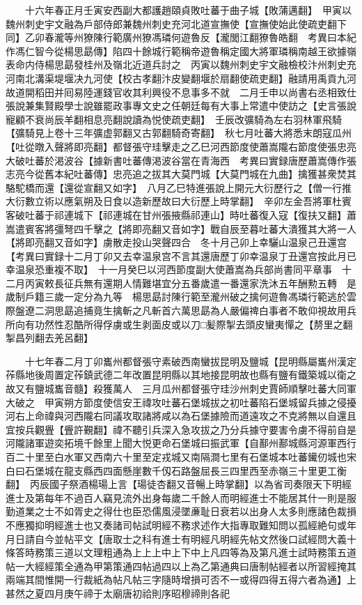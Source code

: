 　　十六年春正月壬寅安西副大都護趙頤貞敗吐蕃于曲子城【敗蒲邁翻】　甲寅以魏州刺史宇文融為戶部侍郎兼魏州刺史充河北道宣撫使【宣撫使始此使疏吏翻下同】乙卯春瀧等州獠陳行範廣州獠馮璘何遊魯反【瀧閭江翻獠魯皓翻　考異曰本紀作馮仁智今從楊思勗傳】陷四十餘城行範稱帝遊魯稱定國大將軍璘稱南越王欲據嶺表命内侍楊思勗發桂州及嶺北近道兵討之　丙寅以魏州刺史宇文融檢校汴州刺史充河南北溝渠堤堰决九河使【校古孝翻汴皮變翻堰於扇翻使疏吏翻】融請用禹貢九河故道開稻田并囘易陸運錢官收其利興役不息事多不就　二月壬申以尚書右丞相致仕張說兼集賢殿學士說雖罷政事專文史之任朝廷每有大事上常遣中使訪之【史言張說寵顧不衰尚辰羊翻相息亮翻說讀為悦使疏吏翻】　壬辰改彍騎為左右羽林軍飛騎【彍騎見上卷十三年彍虚郭翻又古郭翻騎奇寄翻】　秋七月吐蕃大將悉末朗寇瓜州【吐從暾入聲將即亮翻】都督張守珪擊走之乙巳河西節度使蕭嵩隴右節度使張忠亮大破吐蕃於渇波谷【據新書吐蕃傳渇波谷當在青海西　考異曰實録唐歷蕭嵩傳作張志亮今從舊本紀吐蕃傳】忠亮追之拔其大莫門城【大莫門城在九曲】擒獲甚衆焚其駱駝橋而還【還從宣翻又如字】　八月乙巳特進張說上開元大衍歷行之【僧一行推大衍數立術以應氣朔及日食以造新歷故曰大衍歷上時掌翻】　辛卯左金吾將軍杜賓客破吐蕃于祁連城下【祁連城在甘州張掖縣祁連山】時吐蕃復入寇【復扶又翻】蕭嵩遣賓客將彊弩四千擊之【將即亮翻又音如字】戰自辰至暮吐蕃大潰獲其大將一人【將即亮翻又音如字】虜散走投山哭聲四合　冬十月己卯上幸驪山温泉己丑還宫　【考異曰實録十二月丁卯又去幸温泉宫不言其還唐歷丁卯幸温泉丁丑還宫按此月已幸温泉恐重複不取】　十一月癸巳以河西節度副大使蕭嵩為兵部尚書同平章事　十二月丙寅敕長征兵無有還期人情難堪宜分五番歲遣一番還家洗沐五年酬勲五轉　是歲制戶籍三歲一定分為九等　楊思勗討陳行範至瀧州破之擒何遊魯馮璘行範逃於雲際盤遼二洞思勗追捕竟生擒斬之凡斬首六萬思勗為人嚴偏禆白事者不敢仰視故用兵所向有功然性忍酷所得俘虜或生剥面皮或以刀□髪際掣去頭皮蠻夷憚之【剺里之翻掣昌列翻去羌呂翻】

　　十七年春二月丁卯巂州都督張守素破西南蠻拔昆明及鹽城【昆明縣屬巂州漢定莋縣地後周置定莋鎮武德二年改置昆明縣以其地接昆明故也縣有鹽有鐵築城以衛之故又有鹽城巂音髓】殺獲萬人　三月瓜州都督張守珪沙州刺史賈師順擊吐蕃大同軍大破之　甲寅朔方節度使信安王禕攻吐蕃石堡城拔之初吐蕃陷石堡城留兵據之侵擾河右上命禕與河西隴右同議攻取諸將咸以為石堡據險而道遠攻之不克將無以自還且宜按兵觀舋【舋許覲翻】禕不聽引兵深入急攻拔之乃分兵據守要害令虜不得前自是河隴諸軍遊奕拓境千餘里上聞大悦更命石堡城曰振武軍【自鄯州鄯城縣河源軍西行百二十里至白水軍又西南六十里至定戎城又南隔澗七里有石堡城本吐蕃䥫仞城也宋白曰石堡城在龍支縣西四面懸崖數千仭石路盤屈長三四里西至赤嶺三十里更工衡翻】　丙辰國子祭酒楊瑒上言【瑒徒杏翻又音暢上時掌翻】以為省司奏限天下明經進士及第每年不過百人竊見流外出身每歲二千餘人而明經進士不能居其什一則是服勤道業之士不如胥史之得仕也臣恐儒風浸墜亷耻日衰若以出身人太多則應諸色裁損不應獨抑明經進士也又奏諸司帖試明經不務求述作大指專取難知問以孤經絶句或年月日請自今並帖平文【唐取士之科有進士有明經凡明經先帖文然後口試經問大義十條答時務策三道以文理粗通為上上上中上下中上凡四等為及第凡進士試時務策五道帖一大經經策全通為甲第策通四帖過四以上為乙第通典曰唐制帖經者以所習經掩其兩端其間惟開一行裁紙為帖凡帖三字隨時增損可否不一或得四得五得六者為通】上甚然之夏四月庚午禘于太廟唐初祫則序昭穆禘則各祀

